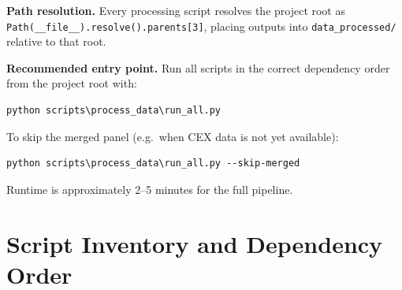 \documentclass[11pt,a4paper]{article}
\begin{document}
\noindent\textbf{Path resolution.} Every processing script resolves the
project root as
\texttt{Path(\_\_file\_\_).resolve().parents[3]}, placing outputs into
\texttt{data\_processed/} relative to that root.

\noindent\textbf{Recommended entry point.} Run all scripts in the correct
dependency order from the project root with:

\begin{lstlisting}
python scripts\process_data\run_all.py
\end{lstlisting}

To skip the merged panel (e.g.\ when CEX data is not yet available):

\begin{lstlisting}
python scripts\process_data\run_all.py --skip-merged
\end{lstlisting}

Runtime is approximately 2--5 minutes for the full pipeline.

\section{Script Inventory and Dependency Order}
\label{sec:inventory}
\end{document}

